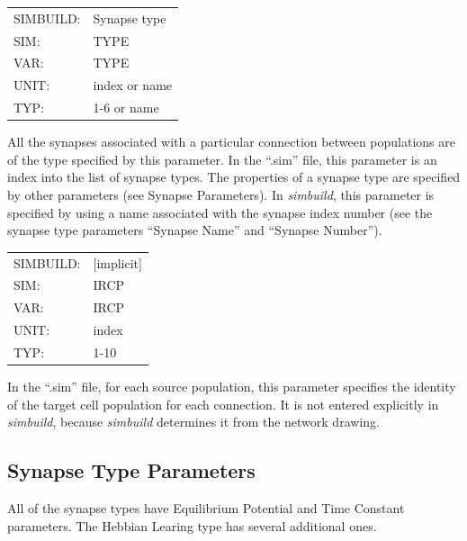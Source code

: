 \documentclass[12pt,openany,oneside]{book}
\newcommand{\prog}[1]{\textit{{#1}}}
\newcommand{\ext}[1]{{{``.#1''}}}
\newcommand{\inquotes}[1]{{{``#1''}}}
\begin{document}
\begin{flushleft}
\begin{tabular}{@{}ll@{}}
SIMBUILD: & Synapse type\\
SIM: & TYPE\\
VAR: & TYPE\\
UNIT: & index or name\\
TYP: & 1-6 or name\\
\end{tabular}
\end{flushleft}
\noindent
All the synapses associated with a particular connection between
populations are of the type specified by this parameter. In the
\ext{sim} file, this parameter is an index into the list of synapse
types. The properties of a synapse type are specified by other
parameters (see Synapse Parameters). In \prog{simbuild}, this parameter is
specified by using a name associated with the synapse index number
(see the synapse type parameters \inquotes{Synapse Name} and \inquotes{Synapse
Number}).
\filbreak
\vspace{\baselineskip}

\begin{flushleft}
\begin{tabular}{@{}ll@{}}
SIMBUILD: & [implicit]\\
SIM: & IRCP\\
VAR: & IRCP\\
UNIT: & index\\
TYP: & 1-10\\
\end{tabular}
\end{flushleft}
\noindent
In the \ext{sim} file, for each source population, this parameter
specifies the identity of the target cell population for each
connection. It is not entered explicitly in \prog{simbuild}, because \prog{simbuild}
determines it from the network drawing.
\filbreak
\vspace{\baselineskip}

\subsection{Synapse Type Parameters}
\label{Synapse Type Parameters}
All of the synapse types have Equilibrium Potential and Time Constant
parameters. The Hebbian Learing type has several additional ones.
\end{document}
